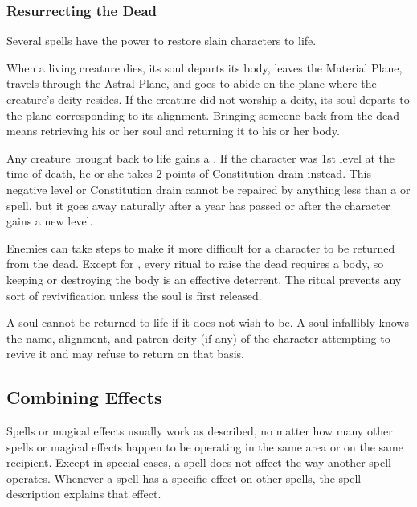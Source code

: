         \subsubsection{Resurrecting the Dead}\label{Resurrecting the Dead}

            Several spells have the power to restore slain characters to life.

            When a living creature dies, its soul departs its body, leaves the Material Plane, travels through the Astral Plane, and goes to abide on the plane where the creature's deity resides. If the creature did not worship a deity, its soul departs to the plane corresponding to its alignment. Bringing someone back from the dead means retrieving his or her soul and returning it to his or her body.

             Any creature brought back to life gains a \negativelevel. If the character was 1st level at the time of death, he or she takes 2 points of Constitution drain instead. This negative level or Constitution drain cannot be repaired by anything less than a  or  spell, but it goes away naturally after a year has passed or after the character gains a new level.

             Enemies can take steps to make it more difficult for a character to be returned from the dead. Except for , every ritual to raise the dead requires a body, so keeping or destroying the body is an effective deterrent. The  ritual prevents any sort of revivification unless the soul is first released.

             A soul cannot be returned to life if it does not wish to be. A soul infallibly knows the name, alignment, and patron deity (if any) of the character attempting to revive it and may refuse to return on that basis.


    \subsection{Combining Effects}
        Spells or magical effects usually work as described, no matter how many other spells or magical effects happen to be operating in the same area or on the same recipient. Except in special cases, a spell does not affect the way another spell operates. Whenever a spell has a specific effect on other spells, the spell description explains that effect.

